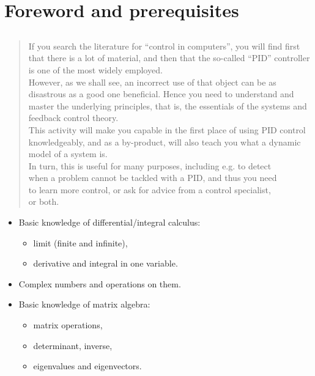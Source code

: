 \section{Foreword and prerequisites}
\subsection{}

\begin{frame}
\myPause
\begin{quote}
If you search the literature for ``control in computers'', you will find first that there is a lot of material, and then that the so-called ``PID'' controller is one of the most widely employed.\\
However, as we shall see, an incorrect use of that object can be as disastrous as a good one beneficial. Hence you need to understand and master the underlying principles, that is, the essentials of the systems and feedback control theory.\\
This activity will make you capable in the first place of using PID control knowledgeably, and as a by-product, will also teach you what a dynamic model of a system is.\\
In turn, this is useful for many purposes, including e.g. to detect\\
when a problem cannot be tackled with a PID, and thus you need\\
to learn more control, or ask for advice from a control specialist,\\
or both.
\end{quote}
\end{frame}

\begin{frame}
\myPause
\begin{itemize}[<+-| alert@+>]
\item Basic knowledge of differential/integral calculus:
      \begin{itemize}[<.(1)->]
      \item limit (finite and infinite),
      \item derivative and integral in one variable.
      \end{itemize}
      \myPause
\item Complex numbers and operations on them.
\item Basic knowledge of matrix algebra:
      \begin{itemize}[<.(1)->]
      \item matrix operations,
      \item determinant, inverse,
      \item eigenvalues and eigenvectors.
      \end{itemize}
\end{itemize}
\end{frame}



